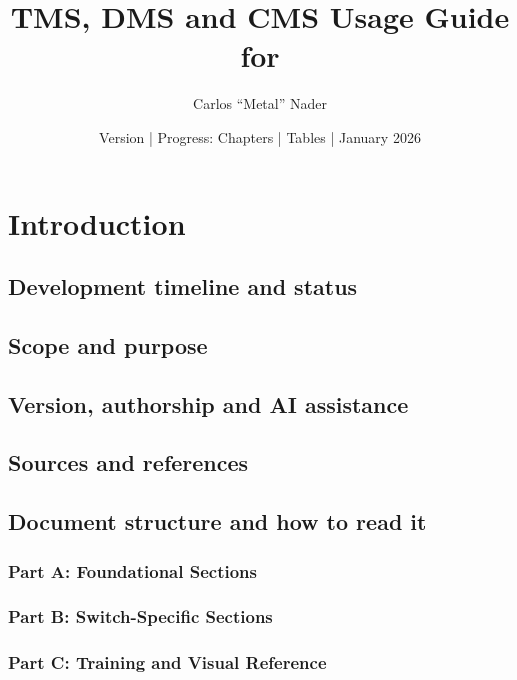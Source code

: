 \documentclass[11pt,a4paper]{article}
\title{TMS, DMS and CMS Usage Guide for \bmsver}
\author{Carlos ``Metal'' Nader}
\date{Version \fulldocversion{} | Progress: Chapters \chapterscompletedof{} | Tables \tablesfilledpct{} | January 2026}
\begin{document}
\maketitle

\newpage
\tableofcontents
{}


\section{Introduction}

\subsection{Development timeline and status}

\subsection{Scope and purpose}

\subsection{Version, authorship and AI assistance}

\subsection{Sources and references}

\subsection{Document structure and how to read it}

\subsubsection{Part A: Foundational Sections}

\subsubsection{Part B: Switch-Specific Sections}

\subsubsection{Part C: Training and Visual Reference}
\end{document}
